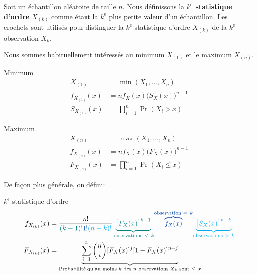 \documentclass[10pt, french]{article}
\begin{document}
\begin{multicols*}{2}
Soit un échantillon aléatoire de taille $n$.
Nous définissons la \textbf{$k^{\text{e}}$ statistique d'ordre} $X_{(k)}$ comme étant la $k^{\text{e}}$ plus petite valeur d'un échantillon.
Les crochets sont utilisés pour distinguer la $k^{\text{e}}$ statistique d'ordre $X_{(k)}$ de la $k^{\text{e}}$ observation $X_{k}$.

Nous sommes habituellement intéressés au minimum $X_{(1)}$ et le maximum $X_{(n)}$.

\setlength{\mathindent}{-0.75cm}
\begin{minipage}{0.5\columnwidth}
\begin{algo}{Minimum}
\begin{align*}
	X_{(1)}
	&=	\min(X_{1}, \dots, X_{n})	\\
	f_{X_{(1)}}(x)
	&=	n f_{X}(x) \big( S_{X}(x) \big)^{n - 1}	\\
	S_{X_{(1)}}(x)
	&=	\prod_{i = 1}^{n} \Pr(X_{i} > x)
\end{align*}
\end{algo}
\end{minipage}
\begin{minipage}{0.5\columnwidth}
\begin{algo}{Maximum}
\begin{align*}
	X_{(n)}
	&=	\max(X_{1}, \dots, X_{n})	\\
	f_{X_{(n)}}(x)
	&=	n f_{X}(x) \big( F_{X}(x) \big)^{n - 1}	\\
	F_{X_{(n)}}(x)
	&=	\prod_{i = 1}^{n} \Pr(X_{i} \le x)
\end{align*}
\end{algo}
\end{minipage}
\setlength{\mathindent}{1cm}

De façon plus générale, on défini:
\begin{algo}{$k^{\text{e}}$ statistique d'ordre}
\begin{align*}
	f_{X_{(k)}}(x)
	&=	\frac{n!}{\textcolor{teal}{(k - 1)!} \textcolor{cobalt}{1!} \textcolor{cyan}{(n - k)!}} \textcolor{teal}{\underset{\text{observations } < \ k}{\underbrace{\big[ F_{X}(x) \big]^{k - 1}}}} \textcolor{cobalt}{\overset{\text{observation } = \ k}{\overbrace{f_{X}(x)}}} \textcolor{cyan}{\underset{\text{observations } > \ k}{\underbrace{\big[ S_{X}(x) \big]^{n - k}}}} \\
	F_{X_{(k)}}(x)
	&=	\underset{\text{Probabilité qu'au moins } k \text{ des } n \text{ observations } X_{k} \text{ sont } \le \ x}{\underbrace{\sum_{i = 1}^{n} \binom{n}{i} [F_{X}(x)]^{j} [1 - F_{X}(x)]^{n - j}}}
\end{align*}
\end{algo}


\end{multicols*}
\end{document}
